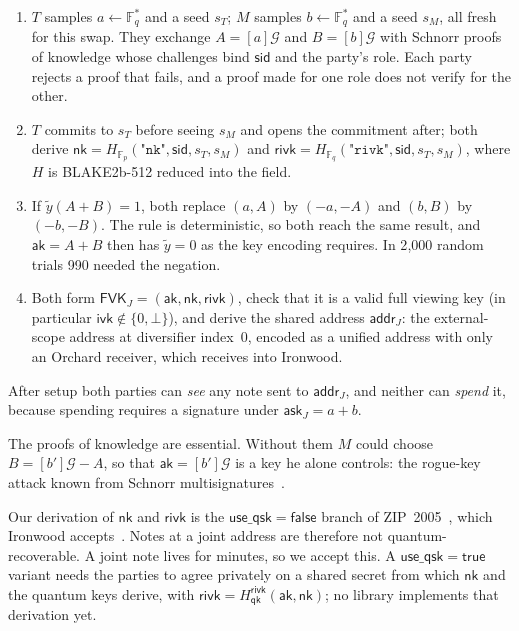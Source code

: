 \documentclass[10pt,letterpaper]{article}
\makeatletter
\renewcommand\subsection{\@startsection{subsection}{2}{\z@}{-0.9em}{0.25em}{\normalfont\normalsize\bfseries}}
\newcommand{\ak}{\mathsf{ak}}
\newcommand{\ask}{\mathsf{ask}}
\newcommand{\nk}{\mathsf{nk}}
\newcommand{\rivk}{\mathsf{rivk}}
\newcommand{\ivk}{\mathsf{ivk}}
\newcommand{\fvk}{\mathsf{FVK}}
\newcommand{\Gor}{\mathcal{G}}
\newcommand{\ytilde}{\tilde{y}}
\makeatother
\begin{document}
\subsection{Key setup}
\begin{enumerate}\setlength\itemsep{0.15em}
\item $T$ samples $a \leftarrow \mathbb{F}_q^*$ and a seed $s_T$; $M$ samples $b \leftarrow \mathbb{F}_q^*$ and a
seed $s_M$, all fresh for this swap. They exchange $A = [a]\Gor$ and $B = [b]\Gor$ with Schnorr proofs
of knowledge whose challenges bind $\mathsf{sid}$ and the party's role. Each party rejects a proof
that fails, and a proof made for one role does not verify for the other.
\item $T$ commits to $s_T$ before seeing $s_M$ and opens the commitment after; both derive
$\nk = H_{\mathbb{F}_p}(\texttt{"nk"}, \mathsf{sid}, s_T, s_M)$ and
$\rivk = H_{\mathbb{F}_q}(\texttt{"rivk"}, \mathsf{sid}, s_T, s_M)$, where $H$ is BLAKE2b-512 reduced into
the field.
\item If $\ytilde(A + B) = 1$, both replace $(a, A)$ by $(-a, -A)$ and $(b, B)$ by $(-b, -B)$. The rule
is deterministic, so both reach the same result, and $\ak = A + B$ then has $\ytilde = 0$ as the
key encoding requires. In 2{,}000 random trials 990 needed the negation.
\item Both form $\fvk_J = (\ak, \nk, \rivk)$, check that it is a valid full viewing key (in
particular $\ivk \notin \{0, \bot\}$), and derive the shared address $\mathsf{addr}_J$: the
external-scope address at diversifier index~0, encoded as a unified address with only an Orchard
receiver, which receives into Ironwood.
\end{enumerate}
After setup both parties can \emph{see} any note sent to $\mathsf{addr}_J$, and neither can
\emph{spend} it, because spending requires a signature under $\ask_J = a + b$.

The proofs of knowledge are essential. Without them $M$ could choose $B = [b']\Gor - A$, so that
$\ak = [b']\Gor$ is a key he alone controls: the rogue-key attack known from Schnorr
multisignatures~\cite{musig}.

Our derivation of $\nk$ and $\rivk$ is the $\mathsf{use\_qsk} = \mathsf{false}$ branch of
ZIP~2005~\cite{zip2005}, which Ironwood accepts~\cite{zip326}. Notes at a joint address are therefore
not quantum-recoverable. A joint note lives for minutes, so we accept this. A
$\mathsf{use\_qsk} = \mathsf{true}$ variant needs the parties to agree privately on a shared secret
from which $\nk$ and the quantum keys derive, with $\rivk = H^{\rivk}_{\mathsf{qk}}(\ak, \nk)$; no
library implements that derivation yet.
\end{document}
